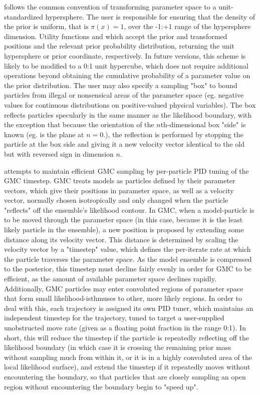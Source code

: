  follows the common convention of transforming parameter space to a unit-standardized hypersphere. The user is responsible for ensuring that the density of the prior is uniform, that is $\pi(x) = 1$, over the -1:+1 range of the hypersphere dimension. Utility functions  and  which accept the prior and transformed positions and the relevant prior probability distribution, returning the unit hypersphere or prior coordinate, respectively. In future versions, this scheme is likely to be modified to a 0:1 unit hypercube, which does not require additional operations beyond obtaining the cumulative probability of a parameter value on the prior distribution. The user may also specify a sampling "box" to bound particles from illegal or nonsensical areas of the parameter space (eg. negative values for continuous distributions on positive-valued physical variables). The box reflects particles specularly in the same manner as the likelihood boundary, with the exception that because the orientation of the $n$th-dimensional box "side" is known (eg. is the plane at $n=0$.), the reflection is performed by stopping the particle at the box side and giving it a new velocity vector identical to the old but with reversed sign in dimension $n$. 

 attempts to maintain efficient GMC sampling by per-particle PID tuning of the GMC timestep. GMC treats models as particles defined by their parameter vectors, which give their positions in parameter space, as well as a velocity vector, normally chosen isotropically and only changed when the particle "reflects" off the ensemble's likelihood contour. In GMC, when a model-particle is to be moved through the parameter space (in this case, because it is the least likely particle in the ensemble), a new position is proposed by extending some distance along its velocity vector. This distance is determined by scaling the velocity vector by a "timestep" value, which defines the per-iterate rate at which the particle traverses the parameter space. As the model ensemble is compressed to the posterior, this timestep must decline fairly evenly in order for GMC to be efficient, as the amount of available parameter space declines rapidly. Additionally, GMC particles may enter convoluted regions of parameter space that form small likelihood-isthmuses to other, more likely regions. In order to deal with this, each trajectory is assigned its own PID tuner, which maintains an independent timestep for the trajectory, tuned to target a user-supplied unobstructed move rate (given as a floating point fraction in the range 0:1). In short, this will reduce the timestep if the particle is repeatedly reflecting off the likelihood boundary (in which case it is crossing the remaining prior mass without sampling much from within it, or it is in a highly convoluted area of the local likelihood surface), and extend the timestep if it repeatedly moves without encountering the boundary, so that particles that are closely sampling an open region without encountering the boundary begin to "speed up".

